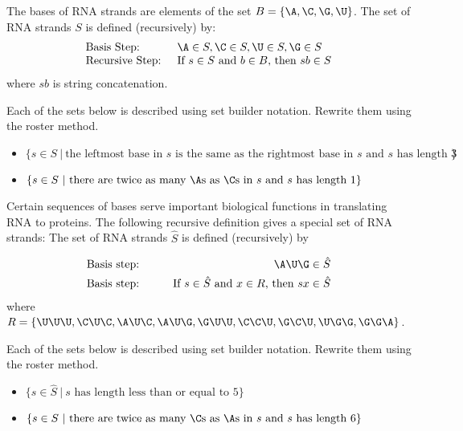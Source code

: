 
The bases of RNA strands are elements of the set $B = \{\A, \C, \G, \U \}$. 
The set of RNA strands $S$ is defined (recursively) by:
\[
\begin{array}{ll}
\textrm{Basis Step: } & \A \in S, \C \in S, \U \in S, \G \in S \\
\textrm{Recursive Step: } & \textrm{If } s \in S\textrm{ and }b \in B \textrm{, then }sb \in S
\end{array}
\]
where $sb$ is string concatenation.

Each of the sets below is described using set builder notation. Rewrite them using the roster method. 
\begin{itemize}
\item $\{s \in S ~|~ \text{the leftmost base in $s$ is the same as the rightmost base in $s$ and 
$s$ has length $3$} \}$ 

\vspace{50pt}

\item $\{s \in S ~|~ \text{there are twice as many $\A$s as $\C$s in $s$ and $s$ has length $1$} \}$ 

\vspace{50pt}

\end{itemize}

Certain 
 sequences of bases serve important biological functions in translating RNA to proteins. The following
 recursive definition gives a special set of RNA strands: The set of RNA strands $\hat{S}$ is defined (recursively)
 by 
 
 \begin{alignat*}{2}
\text{Basis step:} & & \A\U\G \in \hat{S}\\
\text{Basis step:} & \qquad& \text{If } s \in \hat{S} \text{ and } x \in R \text{, then } sx\in \hat{S}\\
 \end{alignat*}
 where $R = \{ \U\U\U, \C\U\C, \A\U\C, \A\U\G, \G\U\U, \C\C\U, \G\C\U, \U\G\G, \G\G\A \}$.

Each of the sets below is described using set builder notation. Rewrite them using the roster method. 
\begin{itemize}
\item $\{s \in \hat{S} ~|~ s \text{ has length less than or equal to $5$} \}$ 

\vspace{50pt}


\item $\{s \in S ~|~ \text{there are twice as many $\C$s as $\A$s in $s$ and $s$ has length $6$} \}$ 

\vspace{50pt}

\end{itemize}